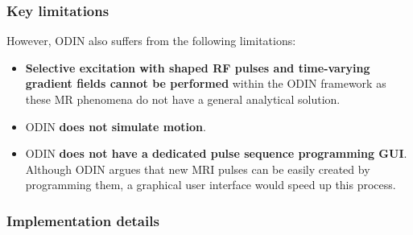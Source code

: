 \subsubsection{Key limitations}
However, ODIN also suffers from the following limitations:
\begin{itemize}
    
    
    
    \item \textbf{Selective excitation with shaped RF pulses and time-varying gradient fields cannot be performed} within the ODIN framework as these MR phenomena do not have a general analytical solution.
    
    
    
    \item ODIN \textbf{does not simulate motion}.
    
    \item ODIN \textbf{does not have a dedicated pulse sequence programming GUI}. Although ODIN argues that new MRI pulses can be easily created by programming them, a graphical user interface would speed up this process.
    
\end{itemize}

\hfill

\subsubsection{Implementation details}

